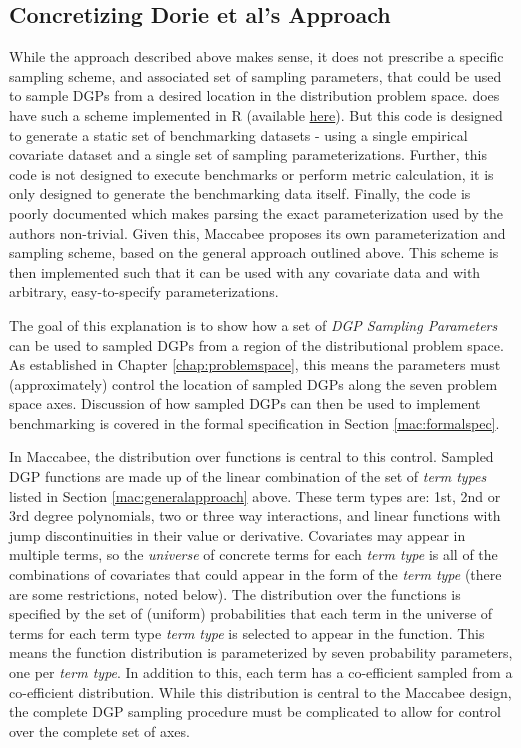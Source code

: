 \documentclass[../main.tex]{subfiles}
\begin{document}
\subsection{Concretizing Dorie et al's Approach}

While the approach described above makes sense, it does not prescribe a specific sampling scheme, and associated set of sampling parameters, that could be used to sample DGPs from a desired location in the distribution problem space. \textcite{Dorie2019Automated1} does have such a scheme implemented in R (available \href{https://github.com/vdorie/aciccomp}{here}). But this code is designed to generate a static set of benchmarking datasets - using a single empirical covariate dataset and a single set of sampling parameterizations. Further, this code is not designed to execute benchmarks or perform metric calculation, it is only designed to generate the benchmarking data itself. Finally, the code is poorly documented which makes parsing the exact parameterization used by the authors non-trivial. Given this, Maccabee proposes its own parameterization and sampling scheme, based on the general approach outlined above. This scheme is then implemented such that it can be used with any covariate data and with arbitrary, easy-to-specify parameterizations.

\vspace{\baselineskip}

The goal of this explanation is to show how a set of \textit{DGP Sampling Parameters} can be used to sampled DGPs from a region of the distributional problem space. As established in Chapter \ref{chap:problemspace}, this means the parameters must (approximately) control the location of sampled DGPs along the seven problem space axes. Discussion of how sampled DGPs can then be used to implement benchmarking is covered in the formal specification in Section \ref{mac:formalspec}.

\vspace{\baselineskip}

In Maccabee, the distribution over functions is central to this control. Sampled DGP functions are made up of the linear combination of the set of \textit{term types} listed in Section \ref{mac:generalapproach} above. These term types are: 1st, 2nd or 3rd degree polynomials, two or three way interactions, and linear functions with jump discontinuities in their value or derivative. Covariates may appear in multiple terms, so the \textit{universe} of concrete terms for each \textit{term type} is all of the combinations of covariates that could appear in the form of the \textit{term type} (there are some restrictions, noted below). The distribution over the functions is specified by the set of (uniform) probabilities that each term in the universe of terms for each term type \textit{term type} is selected to appear in the function. This means the function distribution is parameterized by seven probability parameters, one per \textit{term type}. In addition to this, each term has a co-efficient sampled from a co-efficient distribution. While this distribution is central to the Maccabee design, the complete DGP sampling procedure must be complicated to allow for control over the complete set of axes.
\end{document}
